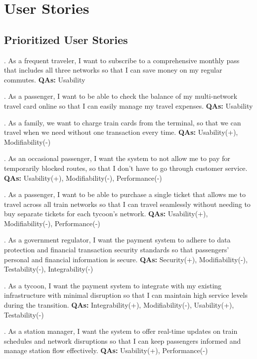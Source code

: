\section{User Stories}

\subsection{Prioritized User Stories}

. As a frequent traveler, I want to subscribe to a comprehensive monthly pass that includes all three networks so that I can save money on my regular commutes. \textbf{QAs:} Usability

. As a passenger, I want to be able to check the balance of my multi-network travel card online so that I can easily manage my travel expenses. \textbf{QAs:} Usability

. As a family, we want to charge train cards from the terminal, so that we can travel when we need without one transaction every time. \textbf{QAs:} Usability(+), Modifiability(-)

. As an occasional passenger, I want the system to not allow me to pay for temporarily blocked routes, so that I don't have to go through customer service. \textbf{QAs:} Usability(+), Modifiability(-), Performance(-)

. As a passenger, I want to be able to purchase a single ticket that allows me to travel across all train networks so that I can travel seamlessly without needing to buy separate tickets for each tycoon's network. \textbf{QAs:} Usability(+), Modifiability(-), Performance(-)

. As a government regulator, I want the payment system to adhere to data protection and financial transaction security standards so that passengers' personal and financial information is secure. \textbf{QAs:} Security(+), Modifiability(-), Testability(-), Integrability(-)

. As a tycoon, I want the payment system to integrate with my existing infrastructure with minimal disruption so that I can maintain high service levels during the transition. \textbf{QAs:} Integrability(+), Modifiability(-), Usability(+), Testability(-)

. As a station manager, I want the system to offer real-time updates on train schedules and network disruptions so that I can keep passengers informed and manage station flow effectively. \textbf{QAs:} Usability(+), Performance(-)

